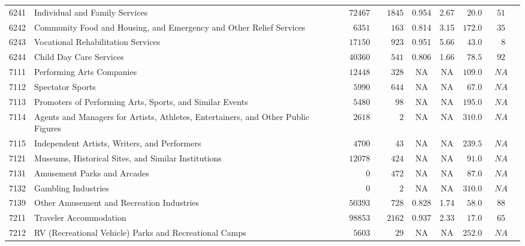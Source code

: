 \documentclass[9pt, oneside]{article}   	%
\begin{document}
\begin{longtable}{lp{3 in}ccccccc}
6241  & Individual and Family Services & $\phantom{0}72467$ & $\phantom{00}1845$ & 0.954 &  2.67 & $\phantom{0}20.0$ & $\phantom{0}51$ \\
6242  & Community Food and Housing, and Emergency and Other Relief Services & $\phantom{00}6351$ & $\phantom{000}163$ & 0.814 &  3.15 & $172.0$ & $\phantom{0}35$ \\
6243  & Vocational Rehabilitation Services & $\phantom{0}17150$ & $\phantom{000}923$ & 0.951 &  5.66 & $\phantom{0}43.0$ & $\phantom{00}8$ \\
6244  & Child Day Care Services & $\phantom{0}40360$ & $\phantom{000}541$ & 0.806 &  1.66 & $\phantom{0}78.5$ & $\phantom{0}92$ \\
7111  & Performing Arts Companies & $\phantom{0}12448$ & $\phantom{000}328$ &    NA &    NA & $109.0$ & $\phantom{0}NA$ \\
7112  & Spectator Sports & $\phantom{00}5990$ & $\phantom{000}644$ &    NA &    NA & $\phantom{0}67.0$ & $\phantom{0}NA$ \\
7113  & Promoters of Performing Arts, Sports, and Similar Events & $\phantom{00}5480$ & $\phantom{0000}98$ &    NA &    NA & $195.0$ & $\phantom{0}NA$ \\
7114  & Agents and Managers for Artists, Athletes, Entertainers, and Other Public Figures & $\phantom{00}2618$ & $\phantom{00000}2$ &    NA &    NA & $310.0$ & $\phantom{0}NA$ \\
7115  & Independent Artists, Writers, and Performers & $\phantom{00}4700$ & $\phantom{0000}43$ &    NA &    NA & $239.5$ & $\phantom{0}NA$ \\
7121  & Museums, Historical Sites, and Similar Institutions & $\phantom{0}12078$ & $\phantom{000}424$ &    NA &    NA & $\phantom{0}91.0$ & $\phantom{0}NA$ \\
7131  & Amusement Parks and Arcades & $\phantom{00000}0$ & $\phantom{000}472$ &    NA &    NA & $\phantom{0}87.0$ & $\phantom{0}NA$ \\
7132  & Gambling Industries & $\phantom{00000}0$ & $\phantom{00000}2$ &    NA &    NA & $310.0$ & $\phantom{0}NA$ \\
7139  & Other Amusement and Recreation Industries & $\phantom{0}50393$ & $\phantom{000}728$ & 0.828 &  1.74 & $\phantom{0}58.0$ & $\phantom{0}88$ \\
7211  & Traveler Accommodation & $\phantom{0}98853$ & $\phantom{00}2162$ & 0.937 &  2.33 & $\phantom{0}17.0$ & $\phantom{0}65$ \\
7212  & RV (Recreational Vehicle) Parks and Recreational Camps & $\phantom{00}5603$ & $\phantom{0000}29$ &    NA &    NA & $252.0$ & $\phantom{0}NA$ \\

\end{longtable}
\end{document}
